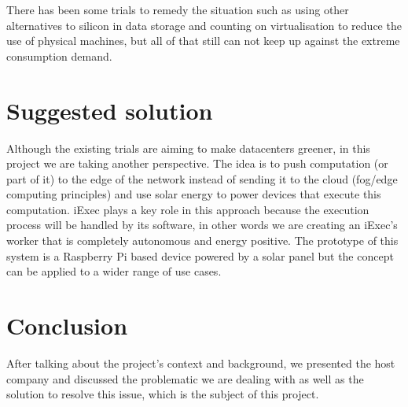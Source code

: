   There has been some trials to remedy the situation such as using other alternatives to silicon in
  data storage and counting on virtualisation to reduce the use of physical machines, but all of that
  still can not keep up against the extreme consumption demand.

\section{Suggested solution}
  Although the existing trials are aiming to make datacenters greener, in this project we are taking another
  perspective. The idea is to push computation (or part of it) to the edge of the network instead of sending
  it to the cloud (fog/edge computing principles) and use solar energy to power devices that execute this
  computation. iExec plays a key role in this approach because the execution process will be handled by its
  software, in other words we are creating an iExec's worker that is completely autonomous and energy positive.
  The prototype of this system is a Raspberry Pi based device powered by a solar panel but the concept can be
  applied to a wider range of use cases.

\section{Conclusion}
  After talking about the project's context and background, we presented the host company and discussed the
  problematic we are dealing with as well as the solution to resolve this issue, which is the subject of this
  project.

\clearpage